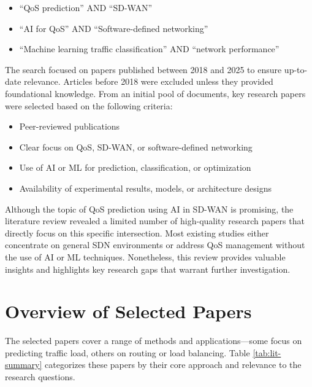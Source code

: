 \documentclass[a4paper,12pt]{Classes/RoboticsLaTeX}
\begin{document}
\begin{itemize}
    \item ``QoS prediction'' AND ``SD-WAN''
    \item ``AI for QoS'' AND ``Software-defined networking''
    \item ``Machine learning traffic classification'' AND ``network performance''
\end{itemize}

The search focused on papers published between 2018 and 2025 to ensure up-to-date relevance. Articles before 2018 were excluded unless they provided foundational knowledge. From an initial pool of documents, key research papers were selected based on the following criteria:
\begin{itemize}
    \item Peer-reviewed publications
    \item Clear focus on QoS, SD-WAN, or software-defined networking
    \item Use of AI or ML for prediction, classification, or optimization
    \item Availability of experimental results, models, or architecture designs
\end{itemize}

Although the topic of QoS prediction using AI in SD-WAN is promising, the literature review revealed a limited number of high-quality research papers that directly focus on this specific intersection. Most existing studies either concentrate on general SDN environments or address QoS management without the use of AI or ML techniques. Nonetheless, this review provides valuable insights and highlights key research gaps that warrant further investigation.
\section{Overview of Selected Papers}

The selected papers cover a range of methods and applications—some focus on predicting traffic load, others on routing or load balancing. Table \ref{tab:lit-summary} categorizes these papers by their core approach and relevance to the research questions.
\end{document}
